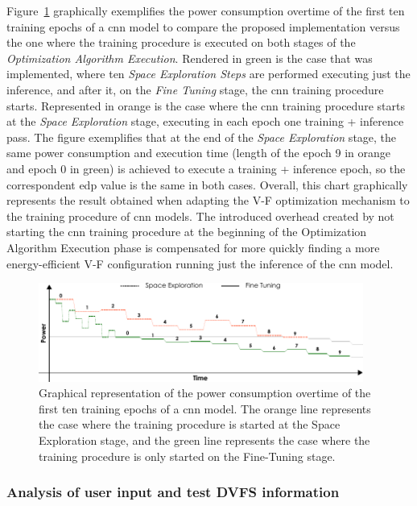 Figure~\ref{fig:comp} graphically exemplifies the power consumption overtime of the first ten training epochs of a \acrshort{cnn} model to compare the proposed implementation versus the one where the training procedure is executed on both stages of the \textit{Optimization Algorithm Execution}. Rendered in green is the case that was implemented, where ten \textit{Space Exploration Steps} are performed executing just the inference, and after it, on the \textit{Fine Tuning} stage, the \acrshort{cnn} training procedure starts. Represented in orange is the case where the \acrshort{cnn} training procedure starts at the \textit{Space Exploration} stage, executing in each epoch one training + inference pass. The figure exemplifies that at the end of the \textit{Space Exploration} stage, the same power consumption and execution time (length of the epoch 9 in orange and epoch 0 in green) is achieved to execute a training + inference epoch, so the correspondent \acrshort{edp} value is the same in both cases. Overall, this chart graphically represents the result obtained when adapting the V-F optimization mechanism to the training procedure of \acrshort{cnn} models. The introduced overhead created by not starting the \acrshort{cnn} training procedure at the beginning of the Optimization Algorithm Execution phase is compensated for more quickly finding a more energy-efficient V-F configuration running just the inference of the \acrshort{cnn} model.

\begin{figure}[htb]
    \centering
        \includegraphics[width=0.95\textwidth]{Figures/Application To Deep Learning/comparacao.pdf}
        \caption{Graphical representation of the power consumption overtime of the first ten training epochs of a \acrshort{cnn} model. The orange line represents the case where the training procedure is started at the Space Exploration stage, and the green line represents the case where the training procedure is only started on the Fine-Tuning stage.}
    \label{fig:comp}
\end{figure}




\subsubsection{Analysis of user input and test DVFS information}

